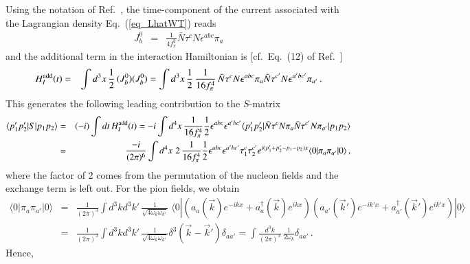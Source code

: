 \documentclass[sort&compress,preprint,3p]{elsarticle}
\begin{document}
Using the notation of Ref.~\cite{Wei95},
the time-component of the current associated with
the Lagrangian density Eq.~(\ref{eq_LhatWT}) reads
\begin{eqnarray}
J^0_b &=& 
\frac{1}{4f_\pi^2} \bar N \tau^c N \epsilon^{abc} \pi_a 
\end{eqnarray}
and the additional term in the interaction Hamiltonian is
[cf.\ Eq.~(12) of Ref.~\cite{Wei91}]
\begin{eqnarray}
H^{\rm add}_I(t) &=& \int d^3 x\,\frac 1 2 \, (J^0_b)(J^0_b) =
\int d^3 x\,
\frac 1 2 \,
\frac{1}{16f_\pi^4} \,
\bar N \tau^c N \epsilon^{abc} \pi_a 
\bar N \tau^{c'} N \epsilon^{a'bc'} \pi_{a'} 
\,.
\end{eqnarray}
This generates the following leading contribution to the $S$-matrix
\begin{eqnarray}
\langle p'_1 p'_2 | S | p_1 p_2 \rangle &=&
(-i) \int dt\, H^{\rm add}_I(t) =
-i \int d^4 x\,
\frac{1}{16f_\pi^4} 
\frac 1 2 \epsilon^{abc} \epsilon^{a'bc'} 
\langle p'_1 p'_2 | \bar N \tau^c N \pi_a \bar N \tau^{c'} N \pi_{a'} | p_1 p_2 \rangle
\nonumber \\ &=&
\frac{-i}{(2\pi)^6} \int d^4 x\,
\, 2 \,
\frac{1}{16f_\pi^4} 
\frac 1 2 \epsilon^{abc} \epsilon^{a'bc'} \tau^c_1 \tau^{c'}_2 
e^{i(p'_1+p'_2-p_1-p_2) x}
\langle 0 | \pi_a \pi_{a'} | 0 \rangle
\,,
\label{eq_S1}
\end{eqnarray}
where the factor of 2 comes from the permutation of the nucleon fields
and the exchange term is left out.
For the pion fields, we obtain
\begin{eqnarray}
\langle 0 | \pi_a \pi_{a'} | 0 \rangle &=&
\frac{1}{(2\pi)^3} \int d^3 k d^3 k'\, \frac{1}{\sqrt{4\omega_k\omega_{k'}}} \;
\langle 0 | \left(a_a(\vec k) e^{-ikx} + a^\dagger_a(\vec k)e^{ikx}\right)
\left(a_{a'}(\vec k') e^{-ik'x} + a^\dagger_{a'}(\vec k')e^{ik'x}\right) | 0 \rangle 
\nonumber \\ &=&
\frac{1}{(2\pi)^3} \int d^3 k d^3 k'\, \frac{1}{\sqrt{4\omega_k\omega_{k'}}}
\delta^3(\vec k - \vec k') \delta_{aa'} =
\int \frac{d^3 k}{(2\pi)^3} \, \frac{1}{2\omega_k}
\delta_{aa'}
\,.
\end{eqnarray}
Hence,
\end{document}
